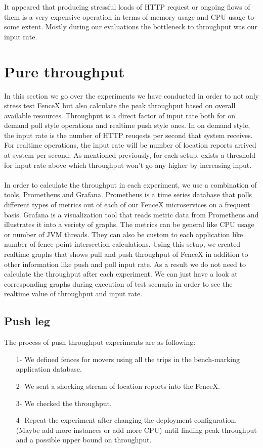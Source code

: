 \documentclass[a4]{report}
\begin{document}
    It appeared that producing stressful loads of HTTP request or ongoing flows of them is a very expensive operation
    in terms of memory usage and CPU usage to some extent.
    Mostly during our evaluations the bottleneck to throughput was our input rate.

    \section{Pure throughput}
    In this section we go over the experiments we have conducted in order to not only stress test FenceX but also
    calculate the peak throughput based on overall available resources.
    Throughput is a direct factor of input rate both for on demand poll style operations and realtime push style ones.
    In on demand style, the input rate is the number of HTTP reuqests per second that system receives.
    For realtime operations, the input rate will be number of location reports arrived at system per second.
    As mentioned previously, for each setup, exists a threshold for input rate above which throughput won't go any
    higher by increasing input.

    \paragraph{}
    In order to calculate the throughput in each experiment, we use a combination of tools, Prometheus and Grafana.
    Prometheus is a time series database that polls different types of metrics out of each of our FenceX
    microservices on a frequent basis.
    Grafana is a  visualization tool that reads metric data from Prometheus and illustrates it into a veriety of graphs.
    The metrics can be general like CPU usage or number of JVM threads.
    They can also be custom to each application like number of fence-point intersection calculations.
    Using this setup, we created realtime graphs that shows pull and push throughput of FenceX in addition to other
    information like push and poll input rate.
    As a result we do not need to calculate the throughput after each experiment.
    We can just have a look at corresponding graphs during execution of test scenario in order to see the realtime
    value of throughput and input rate.


    \subsection{Push leg}
    The process of push throughput experiments are as following:
    \begin{itemize}
        \item[1-] We defined fences for movers using all the trips in the bench-marking application database.
        \item[2-] We sent a shocking stream of location reports into the FenceX.
        \item[3-] We checked the throughput.
        \item[4-] Repeat the experiment after changing the deployment configuration. (Maybe add more instances or add
        more CPU) until finding peak throughput and a possible upper bound on throughput.
    \end{itemize}
\end{document}
